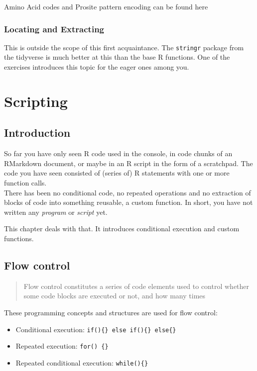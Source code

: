 \documentclass[]{book}
\providecommand{\tightlist}{%
  \setlength{\itemsep}{0pt}\setlength{\parskip}{0pt}}
\begin{document}
Amino Acid codes and Prosite pattern encoding can be found
here

\hypertarget{locating-and-extracting}{%
\subsection{Locating and Extracting}\label{locating-and-extracting}}

This is outside the scope of this first acquaintance. The \texttt{stringr} package from the tidyverse is much better at this than the base R functions. One of the exercises introduces this topic for the eager ones among you.

\hypertarget{scripting}{%
\chapter{Scripting}\label{scripting}}

\hypertarget{introduction}{%
\section{Introduction}\label{introduction}}

So far you have only seen R code used in the console, in code chunks of an RMarkdown document, or maybe in an R script in the form of a scratchpad. The code you have seen consisted of (series of) R statements with one or more function calls.\\
There has been no conditional code, no repeated operations and no extraction of blocks of code into something reusable, a custom function. In short, you have not written any \emph{program} or \emph{script} yet.

This chapter deals with that. It introduces conditional execution and custom functions.

\hypertarget{flow-control}{%
\section{Flow control}\label{flow-control}}

\begin{quote}
Flow control constitutes a series of code elements used to control whether some code blocks are executed or not, and how many times
\end{quote}

These programming concepts and structures are used for flow control:

\begin{itemize}
\tightlist
\item
  Conditional execution: \texttt{if()\{\}\ else\ if()\{\}\ else\{\}}
\item
  Repeated execution: \texttt{for()\ \{\}}
\item
  Repeated conditional execution: \texttt{while()\{\}}
\end{itemize}
\end{document}
